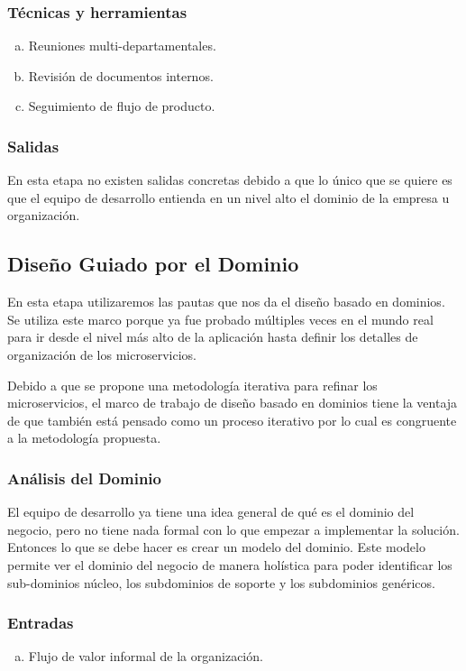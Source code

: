 \subsubsection*{Técnicas y herramientas}
\begin{enumerate}[a.]
	\item Reuniones multi-departamentales.
	\item Revisión de documentos internos.
	\item Seguimiento de flujo de producto.
\end{enumerate}

\subsubsection*{Salidas}
En esta etapa no existen salidas concretas debido a que lo único que se quiere es que el equipo
de desarrollo entienda en un nivel alto el dominio de la empresa u organización.

\subsection{Diseño Guiado por el Dominio}

En esta etapa utilizaremos las pautas que nos da el diseño basado en dominios.
Se utiliza este marco porque ya fue probado múltiples veces en el mundo real para ir desde
el nivel más alto de la aplicación hasta definir los detalles de organización de los microservicios.

Debido a que se propone una metodología iterativa para refinar los microservicios, el marco de trabajo
de diseño basado en dominios tiene la ventaja de que también está pensado como un proceso iterativo
por lo cual es congruente a la metodología propuesta.

\subsubsection{Análisis del Dominio}

El equipo de desarrollo ya tiene una idea general de qué es el dominio del negocio, pero no tiene
nada formal con lo que empezar a implementar la solución.
Entonces lo que se debe hacer es crear un modelo del dominio.
Este modelo permite ver el dominio del negocio de manera holística para poder identificar
los sub-dominios núcleo, los subdominios de soporte y los subdominios genéricos.

\subsubsection*{Entradas}
\begin{enumerate}[a.]
	\item Flujo de valor informal de la organización.
\end{enumerate}

